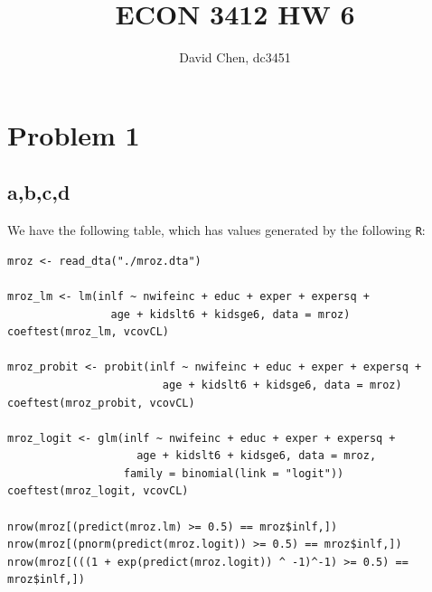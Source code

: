 \documentclass[12pt,letterpaper]{article}
\title{ECON 3412 HW 6}
\author{David Chen, dc3451}
\theoremstyle{definition}
\begin{document}
\maketitle

\section*{Problem 1}
\subsection*{a,b,c,d}

We have the following table, which has values generated by the following \verb|R|:
\begin{Verbatim}[fontsize=\small]
mroz <- read_dta("./mroz.dta")

mroz_lm <- lm(inlf ~ nwifeinc + educ + exper + expersq +
                age + kidslt6 + kidsge6, data = mroz)
coeftest(mroz_lm, vcovCL)

mroz_probit <- probit(inlf ~ nwifeinc + educ + exper + expersq +
                        age + kidslt6 + kidsge6, data = mroz)
coeftest(mroz_probit, vcovCL)

mroz_logit <- glm(inlf ~ nwifeinc + educ + exper + expersq +
                    age + kidslt6 + kidsge6, data = mroz,
                  family = binomial(link = "logit"))
coeftest(mroz_logit, vcovCL)

nrow(mroz[(predict(mroz.lm) >= 0.5) == mroz$inlf,])
nrow(mroz[(pnorm(predict(mroz.logit)) >= 0.5) == mroz$inlf,])
nrow(mroz[(((1 + exp(predict(mroz.logit)) ^ -1)^-1) >= 0.5) == mroz$inlf,])
\end{Verbatim}
\end{document}
